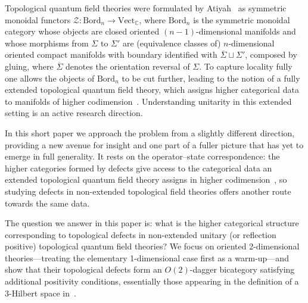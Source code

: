 \documentclass[11pt]{article}
\theoremstyle{definition}
\newcommand{\cZ}{\mathcal{Z}}
\newcommand{\bC}{\mathbb{C}}
\newcommand{\Bord}{\mathrm{Bord}}
\newcommand{\Vect}{\mathrm{Vect}}
\newcommand{\Or}{O} %
\begin{document}
Topological quantum field theories were formulated by Atiyah~\cite{Ati88} as symmetric monoidal functors $\cZ \colon \Bord_n \to \Vect_\bC$, where $\Bord_n$ is the symmetric monoidal category whose objects are closed oriented $(n-1)$-dimensional manifolds and whose morphisms from $\Sigma$ to $\Sigma'$ are (equivalence classes of) $n$-dimensional oriented compact manifolds with boundary identified with $\overline{\Sigma} \sqcup \Sigma'$, composed by gluing, where $\overline{\Sigma}$ denotes the orientation reversal of $\Sigma$. To capture locality fully one allows the objects of $\Bord_n$ to be cut further, leading to the notion of a fully extended topological quantum field theory, which assigns higher categorical data to manifolds of higher codimension~\cite{BD,Lur}. Understanding unitarity in this extended setting is an active research direction.

In this short paper we approach the problem from a slightly different direction, providing a new avenue for insight and one part of a fuller picture that has yet to emerge in full generality. It rests on the operator--state correspondence: the higher categories formed by defects give access to the categorical data an extended topological quantum field theory assigns in higher codimension~\cite{Kap10}, so studying defects in non-extended topological field theories offers another route towards the same data.

The question we answer in this paper is: what is the higher categorical structure corresponding to topological defects in non-extended unitary (or reflection positive) topological quantum field theories? We focus on oriented 2-dimensional theories---treating the elementary 1-dimensional case first as a warm-up---and show that their topological defects form an $\Or(2)$-dagger bicategory satisfying additional positivity conditions, essentially those appearing in the definition of a 3-Hilbert space in~\cite{CHFHS24}.      
\end{document}
